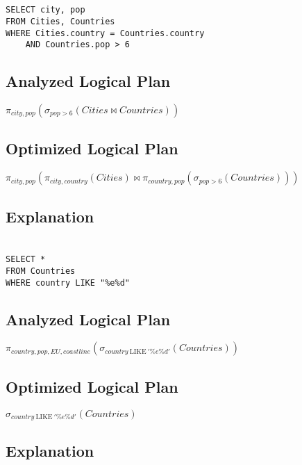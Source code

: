 \documentclass[12pt]{article}
\begin{document}
\newpage

\section{}
\begin{verbatim}
SELECT city, pop
FROM Cities, Countries
WHERE Cities.country = Countries.country
    AND Countries.pop > 6
\end{verbatim}

\subsection*{Analyzed Logical Plan}
$\pi_{city, pop}(\sigma_{pop>6}(Cities \Join Countries))$

\subsection*{Optimized Logical Plan}
$\pi_{city, pop}(\pi_{city,country}(Cities) \Join \pi_{country, pop}(\sigma_{pop>6}(Countries)))$

\subsection*{Explanation}

\newpage

\section{}
\begin{verbatim}
SELECT *
FROM Countries
WHERE country LIKE "%e%d"
\end{verbatim}

\subsection*{Analyzed Logical Plan}
$\pi_{country, pop, EU, coastline}(\sigma_{country\ \mathrm{LIKE}\ '\%e\%d'}(Countries))$

\subsection*{Optimized Logical Plan}
$\sigma_{country\ \mathrm{LIKE}\ '\%e\%d'}(Countries)$

\subsection*{Explanation}
\end{document}
